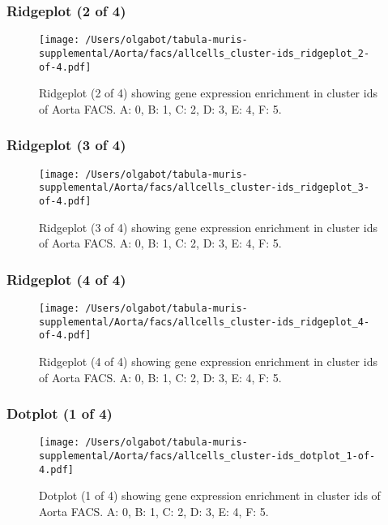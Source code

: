 \clearpage
\clearpage
\subsubsection{Ridgeplot (2 of 4)}
\begin{figure}[h]
\centering
\texttt{[image: /Users/olgabot/tabula-muris-supplemental/Aorta/facs/allcells\_cluster-ids\_ridgeplot\_2-of-4.pdf]}

\caption{ Ridgeplot (2 of 4)  showing gene expression enrichment in cluster ids of Aorta FACS. A: 0, B: 1, C: 2, D: 3, E: 4, F: 5.}
\end{figure}


\clearpage
\clearpage
\subsubsection{Ridgeplot (3 of 4)}
\begin{figure}[h]
\centering
\texttt{[image: /Users/olgabot/tabula-muris-supplemental/Aorta/facs/allcells\_cluster-ids\_ridgeplot\_3-of-4.pdf]}

\caption{ Ridgeplot (3 of 4)  showing gene expression enrichment in cluster ids of Aorta FACS. A: 0, B: 1, C: 2, D: 3, E: 4, F: 5.}
\end{figure}


\clearpage
\clearpage
\subsubsection{Ridgeplot (4 of 4)}
\begin{figure}[h]
\centering
\texttt{[image: /Users/olgabot/tabula-muris-supplemental/Aorta/facs/allcells\_cluster-ids\_ridgeplot\_4-of-4.pdf]}

\caption{ Ridgeplot (4 of 4)  showing gene expression enrichment in cluster ids of Aorta FACS. A: 0, B: 1, C: 2, D: 3, E: 4, F: 5.}
\end{figure}


\clearpage
\clearpage
\subsubsection{Dotplot (1 of 4)}
\begin{figure}[h]
\centering
\texttt{[image: /Users/olgabot/tabula-muris-supplemental/Aorta/facs/allcells\_cluster-ids\_dotplot\_1-of-4.pdf]}

\caption{ Dotplot (1 of 4)  showing gene expression enrichment in cluster ids of Aorta FACS. A: 0, B: 1, C: 2, D: 3, E: 4, F: 5.}
\end{figure}


